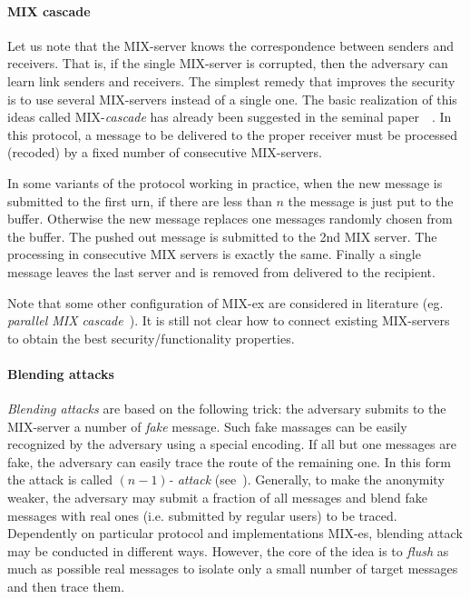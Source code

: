 \documentclass[submission]{dmtcs}
\begin{document}
\paragraph{MIX cascade}  Let us note that the  MIX-server knows  the correspondence between senders and receivers. That is, if the single 
MIX-server is corrupted, then the adversary can learn link senders and receivers. The simplest remedy that improves the security is to use several MIX-servers instead of a single one. The basic realization of this ideas called MIX-\textit{cascade} has already been suggested in the seminal paper~\cite{MIX}~. 
In this protocol, a message to be delivered to the proper receiver must be processed  (recoded) by a fixed number of consecutive MIX-servers. 



In some variants of the protocol working in practice,  when the new message is submitted to the first urn, if there are less than $n$
the message is just put to the buffer. Otherwise the new message replaces one messages randomly chosen from the buffer. The pushed out message is submitted to the 2nd MIX server. The processing in consecutive MIX servers is exactly the same. Finally a single message leaves the last server and is removed from delivered to the recipient.  


Note that some other configuration of MIX-ex are considered in literature (eg. \textit{parallel MIX cascade}~\cite{PMCmy,PMConi}). It is still not clear how to connect existing MIX-servers to obtain the best security/functionality properties.  



\paragraph{Blending attacks} \textit{Blending attacks} are based on the following trick: the adversary submits to the MIX-server a number of \textit{fake} message. Such fake massages can be easily recognized  by the adversary using a special encoding.  If all but one messages are fake, the adversary can easily trace the route of the remaining one. In this form the attack is called \textit{$(n-1)$- attack} (see~\cite{DOGAN}). Generally, to make the anonymity weaker, the adversary may submit a fraction of all messages and blend fake messages with real ones (i.e. submitted by regular users) to be traced.  
Dependently on particular protocol and implementations MIX-es, blending attack may be conducted in different ways. However, the core of the idea is to \textit{flush} as much as possible real messages to isolate only a small number of target messages and then trace them. 
\end{document}
